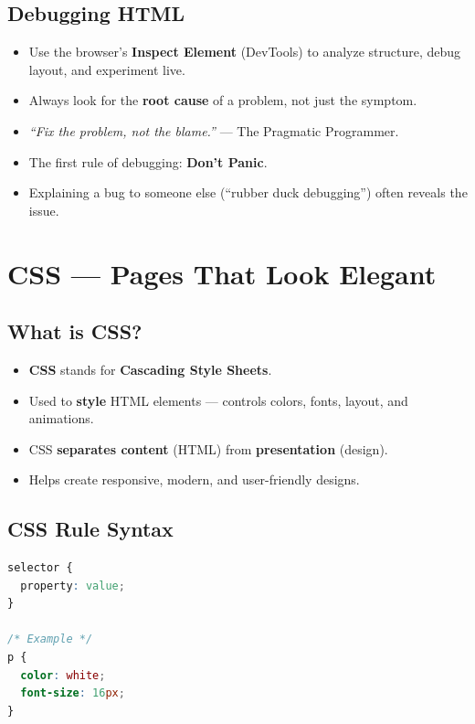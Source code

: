 \documentclass[hidelinks]{article}
\begin{document}
\subsection{Debugging HTML}
\begin{itemize}
  \item Use the browser's \textbf{Inspect Element} (DevTools) to analyze structure, debug layout, and experiment live.
  \item Always look for the \textbf{root cause} of a problem, not just the symptom.
  \item \textit{``Fix the problem, not the blame.''} --- The Pragmatic Programmer.
  \item The first rule of debugging: \textbf{Don't Panic}.
  \item Explaining a bug to someone else (``rubber duck debugging'') often reveals the issue.
\end{itemize}

\newpage
\section{CSS --- Pages That Look Elegant}

\subsection{What is CSS?}
\begin{itemize}
  \item \textbf{CSS} stands for \textbf{Cascading Style Sheets}.
  \item Used to \textbf{style} HTML elements --- controls colors, fonts, layout, and animations.
  \item CSS \textbf{separates content} (HTML) from \textbf{presentation} (design).
  \item Helps create responsive, modern, and user-friendly designs.
\end{itemize}

\subsection{CSS Rule Syntax}
\begin{lstlisting}[language=CSS, caption={CSS rule anatomy}]
selector {
  property: value;
}

/* Example */
p {
  color: white;
  font-size: 16px;
}
\end{lstlisting}
\end{document}
